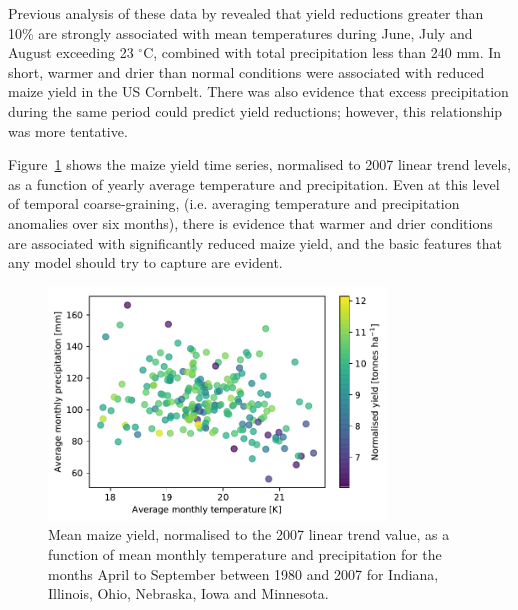 \documentclass[12pt]{iopart}
\begin{document}
Previous analysis of these data by \cite{kent:2017} revealed that yield reductions greater than 10\% are strongly associated with mean temperatures during June, July and August exceeding 23 $^\circ$C, combined with total precipitation less than 240 mm. In short, warmer and drier than normal conditions were associated with reduced maize yield in the US Cornbelt. There was also evidence that excess precipitation during the same period could predict yield reductions; however, this relationship was more tentative. %

Figure~\ref{fig:real_yield_responses} shows the maize yield time series, normalised to 2007 linear trend levels, as a function of yearly average temperature and precipitation. %
Even at this level of temporal coarse-graining, (i.e. averaging temperature and precipitation anomalies over six months), there is evidence that warmer and drier conditions are associated with significantly reduced maize yield, and the basic features that any model should try to capture are evident. 

\begin{figure}
\centering
\includegraphics[width=0.8\textwidth]{./figures/mean_real_data_scatter}
\caption{\label{fig:real_yield_responses} Mean maize yield, normalised to the 2007 linear trend value, as a function of mean monthly temperature and precipitation for the months April to September between 1980 and 2007 for Indiana, Illinois, Ohio, Nebraska, Iowa and Minnesota.}
\end{figure}
\end{document}
